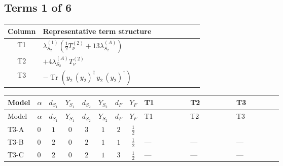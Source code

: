 \documentclass[8pt]{article}
\begin{document}
\begin{landscape}
\subsection*{Terms 1 of 6}
\begin{center}
\begin{tabular}{@{}c >{\raggedright\arraybackslash}p{0.82\linewidth}@{}}
\toprule
Column & Representative term structure \\
\midrule
T1 & \(\displaystyle {\lambda_{S_2}^{(1)}} \left(\frac{1}{2} T_{\nu}^{(2)}+13 {\lambda_{S_2}^{(A)}}\right)\) \\
\midrule
T2 & \(\displaystyle +4 {\lambda_{S_2}^{(A)}} T_{\nu}^{(2)}\) \\
\midrule
T3 & \(\displaystyle -\operatorname{Tr}\!\left({y_2}\,\left({y_2}\right)^{\dagger}\,{y_2}\,\left({y_2}\right)^{\dagger}\right)\) \\
\midrule
\bottomrule
\end{tabular}
\end{center}
\smallskip
\tiny
\begin{longtable}{@{}llcccccc >{\raggedright\arraybackslash}p{0.21\linewidth} >{\raggedright\arraybackslash}p{0.21\linewidth} >{\raggedright\arraybackslash}p{0.21\linewidth}@{}}
\toprule
Model & $\alpha$ & $d_{S_1}$ & $Y_{S_1}$ & $d_{S_2}$ & $Y_{S_2}$ & $d_F$ & $Y_F$ & T1 & T2 & T3 \\
\midrule
\endfirsthead
\toprule
Model & $\alpha$ & $d_{S_1}$ & $Y_{S_1}$ & $d_{S_2}$ & $Y_{S_2}$ & $d_F$ & $Y_F$ & T1 & T2 & T3 \\
\midrule
\endhead
T3-A & $0$ & $1$ & $0$ & $3$ & $1$ & $2$ & $\frac{1}{2}$ & \scriptsize\adjustbox{max width=\linewidth}{$\begin{gathered} {\lambda_{S_2}^{(1)}} \left(\frac{1}{2} T_{\nu}^{(2)}+13 {\lambda_{S_2}^{(A)}}\right)\end{gathered}$} & \scriptsize\adjustbox{max width=\linewidth}{$\begin{gathered} +4 {\lambda_{S_2}^{(A)}} T_{\nu}^{(2)}\end{gathered}$} & \scriptsize\adjustbox{max width=\linewidth}{$\begin{gathered} -\operatorname{Tr}\!\left({y_2}\,\left({y_2}\right)^{\dagger}\,{y_2}\,\left({y_2}\right)^{\dagger}\right)\end{gathered}$} \\
\midrule
T3-B & $0$ & $2$ & $0$ & $2$ & $1$ & $1$ & $\frac{1}{2}$ & --- & --- & --- \\
\midrule
T3-C & $0$ & $2$ & $0$ & $2$ & $1$ & $3$ & $\frac{1}{2}$ & --- & --- & --- \\

\end{longtable}
\end{landscape}
\end{document}
